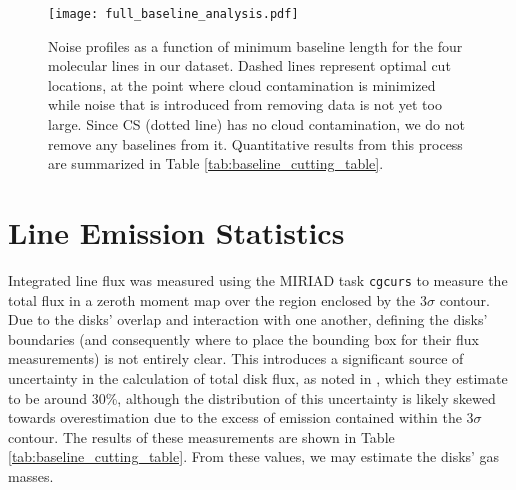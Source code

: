

\begin{figure}[t]
  \texttt{[image: full\_baseline\_analysis.pdf]}%
  \caption{Noise profiles as a function of minimum baseline length for the four molecular lines in our dataset. Dashed lines represent optimal cut locations, at the point where cloud contamination is minimized while noise that is introduced from removing data is not yet too large. Since CS (dotted line) has no cloud contamination, we do not remove any baselines from it. Quantitative results from this process are summarized in Table \ref{tab:baseline_cutting_table}.}
  \label{fig:noise_profiles}
\end{figure}





\section{Line Emission Statistics}
\label{section:line_data}

Integrated line flux was measured using the \textsc{MIRIAD} task \texttt{cgcurs} to measure the total flux in a zeroth moment map over the region enclosed by the 3$\sigma$ contour. Due to the disks' overlap and interaction with one another, defining the disks' boundaries (and consequently where to place the bounding box for their flux measurements) is not entirely clear. This introduces a significant source of uncertainty in the calculation of total disk flux, as noted in \citet{Williams2014}, which they estimate to be around 30\%, although the distribution of this uncertainty is likely skewed towards overestimation due to the excess of emission contained within the $3\sigma$ contour. The results of these measurements are shown in Table \ref{tab:baseline_cutting_table}. From these values, we may estimate the disks' gas masses.


